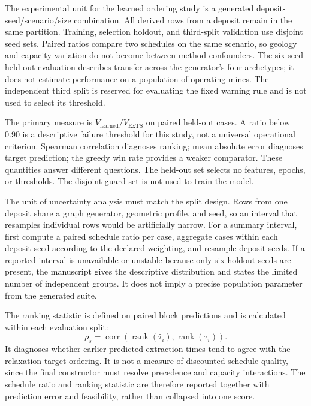 \documentclass[11pt]{article}
\begin{document}
The experimental unit for the learned ordering study is a generated deposit-seed/scenario/size combination. All derived rows from a deposit remain in the same partition. Training, selection holdout, and third-split validation use disjoint seed sets. Paired ratios compare two schedules on the same scenario, so geology and capacity variation do not become between-method confounders. The six-seed held-out evaluation describes transfer across the generator's four archetypes; it does not estimate performance on a population of operating mines. The independent third split is reserved for evaluating the fixed warning rule and is not used to select its threshold.

The primary measure is $V_{\mathrm{learned}}/V_{\mathrm{ExTS}}$ on paired held-out cases. A ratio below 0.90 is a descriptive failure threshold for this study, not a universal operational criterion. Spearman correlation diagnoses ranking; mean absolute error diagnoses target prediction; the greedy win rate provides a weaker comparator. These quantities answer different questions. The held-out set selects no features, epochs, or thresholds. The disjoint guard set is not used to train the model.

The unit of uncertainty analysis must match the split design. Rows from one deposit share a graph generator, geometric profile, and seed, so an interval that resamples individual rows would be artificially narrow. For a summary interval, first compute a paired schedule ratio per case, aggregate cases within each deposit seed according to the declared weighting, and resample deposit seeds. If a reported interval is unavailable or unstable because only six holdout seeds are present, the manuscript gives the descriptive distribution and states the limited number of independent groups. It does not imply a precise population parameter from the generated suite.

The ranking statistic is defined on paired block predictions and is calculated within each evaluation split:
\begin{equation}
 \rho_s=\operatorname{corr}\left(\operatorname{rank}(\hat\tau_i),\operatorname{rank}(\tau_i)\right).
\end{equation}
It diagnoses whether earlier predicted extraction times tend to agree with the relaxation target ordering. It is not a measure of discounted schedule quality, since the final constructor must resolve precedence and capacity interactions. The schedule ratio and ranking statistic are therefore reported together with prediction error and feasibility, rather than collapsed into one score.
\end{document}
